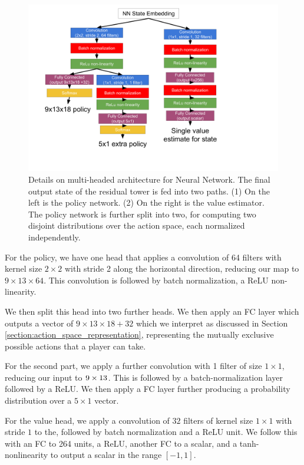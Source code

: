 \documentclass[10pt,twocolumn,letterpaper]{article}
\begin{document}
\begin{figure}[!ht]
    \centering
    \includegraphics[scale=0.09]{figures/mutli-head-architecture.png}
    \caption{Details on multi-headed architecture for Neural Network. The final output state of the residual tower is fed into two paths. (1) On the left is the  policy network. (2) On the right is the value estimator. The policy network is further split into two, for computing two disjoint distributions over the action space, each normalized independently.}
    \label{fig:multi_head_architecture}
\end{figure}

For the policy, we have one head that applies a convolution of 64 filters with kernel size $2 \times 2$ with stride 2 along the horizontal direction, reducing our map to $9 \times 13 \times 64$. This convolution is followed by batch normalization, a ReLU non-linearity.

We then split this head into two further heads. We then apply an FC layer which outputs a vector of $9 \times 13 \times 18 + 32$ which we interpret as discussed in Section \ref{section:action_space_representation}, representing the mutually exclusive possible actions that a player can take.

For the second part, we apply a further convolution with 1 filter of size $1 \times 1$, reducing our input to $9 \times 13 \time 1$. This is followed by a batch-normalization layer followed by a ReLU. We then apply a FC layer further producing a probability distribution over a $5 \times 1$ vector.


For the value head, we apply a convolution of $32$ filters of kernel size $1 \times 1$ with stride $1$ to the, followed by batch normalization and a ReLU unit. We follow this with an FC to 264 units, a ReLU, another FC to a scalar, and a tanh-nonlinearity to output a scalar in the range $[-1, 1]$.
\end{document}
